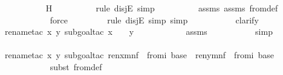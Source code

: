 \begin{isabellebody}
\ \ \ \ \ \ \ \ \isamarkupfalse%
\ H\ \isanewline
\ \ \ \ \ \ \ \ \isamarkupfalse%
{\isacharparenleft}{\kern0pt}rule\ disjE{\isacharcomma}{\kern0pt}\ simp{\isacharparenright}{\kern0pt}\isanewline
\ \ \ \ \ \ \ \ \isamarkupfalse%
\ assms{}\ assms{}\ {\isasymDelta}{}{\isacharunderscore}{\kern0pt}from{\isacharunderscore}{\kern0pt}def\isanewline
\ \ \ \ \ \ \ \ \ \isamarkupfalse%
\ force\isanewline
\ \ \ \ \ \ \ \ \isamarkupfalse%
{\isacharparenleft}{\kern0pt}rule\ disjE{\isacharcomma}{\kern0pt}\ simp{\isacharcomma}{\kern0pt}\ simp{\isacharparenright}{\kern0pt}\isanewline
\ \ \ \ \ \ \ \ \ \isamarkupfalse%
\ clarify\isanewline
\ \ \ \ \ \ \ \ \ \isamarkupfalse%
{\isacharparenleft}{\kern0pt}rename{\isacharunderscore}{\kern0pt}tac\ x\ y{\isacharcomma}{\kern0pt}\ subgoal{\isacharunderscore}{\kern0pt}tac\ {\isachardoublequoteopen}x\ {\isasymin}\ {\isasymDelta}{}\ {\isasymand}\ y\ {\isasymin}\ {\isasymDelta}{}{\isachardoublequoteclose}{\isacharparenright}{\kern0pt}\isanewline
\ \ \ \ \ \ \ \ \isamarkupfalse%
\ assms{}\isanewline
\ \ \ \ \ \ \ \ \ \isamarkupfalse%
\ simp\isanewline
\ \ \ \ \ \ \ \ \ \isamarkupfalse%
{\isacharparenleft}{\kern0pt}rename{\isacharunderscore}{\kern0pt}tac\ x\ y{\isacharcomma}{\kern0pt}\ subgoal{\isacharunderscore}{\kern0pt}tac\ {\isachardoublequoteopen}ren{\isacharparenleft}{\kern0pt}x{\isacharparenright}{\kern0pt}{\isacharbackquote}{\kern0pt}m{\isacharbackquote}{\kern0pt}n{\isacharbackquote}{\kern0pt}f\ {\isasymin}\ {\isasymDelta}{}{\isacharunderscore}{\kern0pt}from{\isacharcircum}{\kern0pt}i\ {\isacharparenleft}{\kern0pt}{\isasymDelta}{}{\isacharunderscore}{\kern0pt}base{\isacharparenright}{\kern0pt}\ {\isasymand}\ ren{\isacharparenleft}{\kern0pt}y{\isacharparenright}{\kern0pt}{\isacharbackquote}{\kern0pt}m{\isacharbackquote}{\kern0pt}n{\isacharbackquote}{\kern0pt}f\ {\isasymin}\ {\isasymDelta}{}{\isacharunderscore}{\kern0pt}from{\isacharcircum}{\kern0pt}i\ {\isacharparenleft}{\kern0pt}{\isasymDelta}{}{\isacharunderscore}{\kern0pt}base{\isacharparenright}{\kern0pt}{\isachardoublequoteclose}{\isacharparenright}{\kern0pt}\isanewline
\ \ \ \ \ \ \ \ \ \ \isamarkupfalse%
{\isacharparenleft}{\kern0pt}subst\ {\isasymDelta}{}{\isacharunderscore}{\kern0pt}from{\isacharunderscore}{\kern0pt}def{\isacharparenright}{\kern0pt}\isanewline

\end{isabellebody}
